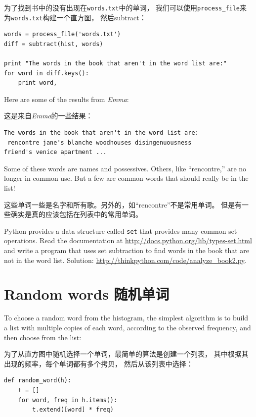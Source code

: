 \documentclass[10pt]{book}
\begin{document}
\begin{CJK}{UTF8}{gbsn}
为了找到书中的没有出现在{\tt words.txt}中的单词，
我们可以使用\verb"process_file"来为{\tt words.txt}构建一个直方图，
然后subtract：

\begin{verbatim}
words = process_file('words.txt')
diff = subtract(hist, words)

print "The words in the book that aren't in the word list are:"
for word in diff.keys():
    print word,
\end{verbatim}
%
Here are some of the results from {\em Emma}:

这是来自{\em Emma}的一些结果：

\begin{verbatim}
The words in the book that aren't in the word list are:
 rencontre jane's blanche woodhouses disingenuousness 
friend's venice apartment ...
\end{verbatim}
%
Some of these words are names and possessives.  Others, like
``rencontre,'' are no longer in common use.  But a few are common
words that should really be in the list!

这些单词一些是名字和所有歌。另外的，如``rencontre''不是常用单词。
但是有一些确实是真的应该包括在列表中的常用单词。

\begin{exercise}

Python provides a data structure called {\tt set} that provides many
common set operations.  Read the documentation at
\url{http://docs.python.org/lib/types-set.html} and write a program
that uses set subtraction to find words in the book that are not in
the word list.  Solution: \url{http://thinkpython.com/code/analyze_book2.py}.

\end{exercise}


\section{Random words 随机单词}
\label{randomwords}

To choose a random word from the histogram, the simplest algorithm
is to build a list with multiple copies of each word, according
to the observed frequency, and then choose from the list:

为了从直方图中随机选择一个单词，最简单的算法是创建一个列表，
其中根据其出现的频率，每个单词都有多个拷贝，
然后从该列表中选择：

\begin{verbatim}
def random_word(h):
    t = []
    for word, freq in h.items():
        t.extend([word] * freq)


\end{verbatim}
\end{CJK}
\end{document}
